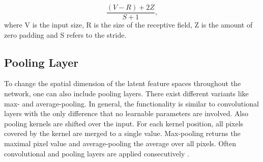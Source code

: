 \begin{equation}
  \frac{(V-R)+2Z}{S+1}, 
  \label{eq:spatial_dimensionality_cnn_feature map}
\end{equation}
where V is the input size, R is the size of the receptive field, Z is the amount of zero padding and S refers to the stride.

\subsection{Pooling Layer}
To change the spatial dimension of the latent feature spaces throughout the network, one can also include pooling layers. There exist different variants like max- and average-pooling. In general, the functionality is similar to convolutional layers with the only difference that no learnable parameters are involved. Also pooling kernels are shifted over the input. For each kernel position, all pixels covered by the kernel are merged to a single value. Max-pooling returns the maximal pixel value and average-pooling the average over all pixels. Often convolutional and pooling layers are applied consecutively \cite{OShea2015}.

